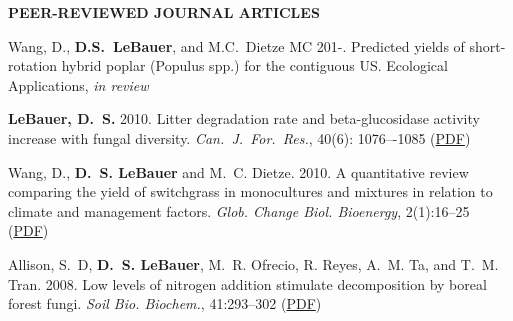 \documentclass[10pt,twoside]{article}
\begin{document}
\textbf{PEER-REVIEWED JOURNAL ARTICLES}
\begin{itemize*}



\item \noindent Wang, D., \textbf{D.S.~LeBauer}, and M.C.~Dietze MC 201-. Predicted yields of short-rotation hybrid poplar (Populus spp.) for the contiguous US. Ecological Applications, \textit{in review}

\item \noindent%


\item \noindent%
\textbf{LeBauer, D.~S.} 2010. Litter degradation rate and beta-glucosidase activity increase with fungal diversity. \textit{Can.\ J.\ For.\ Res.}, 40(6): 1076–-1085
\ifpdf %
(\href{https://netfiles.uiuc.edu/dlebauer/www/lebauer2010ldr.pdf}{PDF})
\fi %

\item \noindent%
Wang, D., \textbf{D.~S. LeBauer} and M.~C. Dietze. 2010. A quantitative review comparing the yield of
switchgrass in monocultures and mixtures in relation to climate and management factors. \textit{Glob.
Change Biol. Bioenergy}, 2(1):16--25
\ifpdf %
(\href{https://netfiles.uiuc.edu/dlebauer/www/wang2010qrc.pdf}{PDF})
\fi %

\item \noindent%
Allison, S.~D, \textbf{D.~S. LeBauer}, M.~R. Ofrecio, R. Reyes, A.~M. Ta, and T.~M. Tran. 2008. Low levels of
nitrogen addition stimulate decomposition by boreal forest fungi. \textit{Soil Bio. Biochem.}, 41:293--302
\ifpdf %
(\href{https://netfiles.uiuc.edu/dlebauer/www/allison2009qrc.pdf}{PDF})
\fi %


\end{itemize*}
\end{document}
